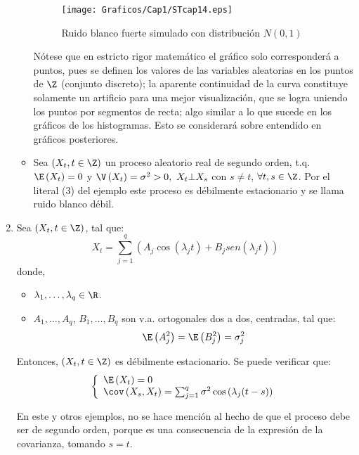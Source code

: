 \begin{ejemplo}
\begin{enumerate}
\begin{itemize}
\begin{figure}[H]
\centering
\texttt{[image: Graficos/Cap1/STcap14.eps]}
\caption{Ruido blanco fuerte simulado con distribuci\'{o}n $N(0,1)$}\label{fig4}
\end{figure}

\begin{observacion}
N\'{o}tese que en estricto rigor matem\'{a}tico el gr\'{a}fico solo corresponder\'{a} a puntos, pues se definen los valores de las variables aleatorias en los puntos de $\Z$ (conjunto discreto); la aparente continuidad de la curva constituye solamente un artificio para una mejor visualizaci\'{o}n, que se logra uniendo los puntos por segmentos de recta; algo similar a lo que sucede en los gr\'{a}ficos de los histogramas. Esto se considerar\'{a} sobre entendido en gr\'{a}ficos posteriores.
\end{observacion}


\item Sea $(X_{t}, t\in \Z)$ un proceso aleatorio real de segundo orden, t.q. $\E\left( X_{t} \right)=0$ y $\V\left( X_{t} \right)=\sigma^{2}>0,\ X_{t}\bot X_{s}$ con $s\neq t$, $\forall t, s\in \Z$. Por el literal (3) del ejemplo este proceso es d\'{e}bilmente estacionario y se llama ruido blanco d\'{e}bil.
\end{itemize}

\item Sea $(X_{t}, t\in \Z)$, tal que: 
	\[
		X_{t}=\sum_{j=1}^q \left( A_{j}\cos \left( \lambda_{j}t \right)+B_{j}sen\left( \lambda_{j}t \right) \right) 
	\]
donde,
\begin{itemize}
	\item $\lambda_{1},\dots,\lambda_{q}\in \R$.
	\item $A_{1},\dots,A_{q}$, $B_{1},\dots,B_{q}$ son v.a. ortogonales dos a dos, centradas, tal que:
	\[
	\E\left( A_{j}^{2} \right)=\E\left( B_{j}^{2} \right)=\sigma_{j}^{2}
	\]
\end{itemize}
Entonces, $(X_{t}, t\in \Z)$ es d\'{e}bilmente estacionario. Se puede verificar que:
\[
	\left\{ {\begin{array}{l}
	\E\left( X_{t} \right)=0\\ 
	\cov\left( X_{s},X_{t} \right)=\sum_{j=1}^q {\sigma^{2}\cos\left( \lambda_{j}(t-s) \right)} \\ 
	\end{array}} \right.
\]
	
En este y otros ejemplos, no se hace menci\'{o}n al hecho de que el proceso debe ser de segundo orden, porque es una consecuencia de la expresi\'{o}n de la covarianza, tomando $s=t$.


\end{enumerate}
\end{ejemplo}
